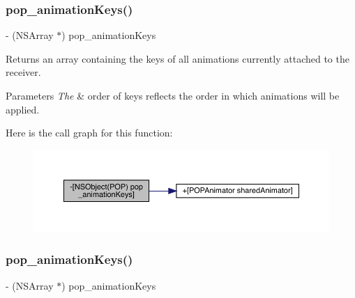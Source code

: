 \subsubsection{\texorpdfstring{pop\+\_\+animation\+Keys()}{pop\_animationKeys()}\hspace{0.1cm}{\footnotesize\ttfamily [2/3]}}
{\footnotesize\ttfamily -\/ (N\+S\+Array $\ast$) pop\+\_\+animation\+Keys \begin{DoxyParamCaption}{ }\end{DoxyParamCaption}}

Returns an array containing the keys of all animations currently attached to the receiver. 
\begin{DoxyParams}{Parameters}
{\em The} & order of keys reflects the order in which animations will be applied. \\
\hline
\end{DoxyParams}
Here is the call graph for this function\+:\nopagebreak
\begin{figure}[H]
\begin{center}
\leavevmode
\includegraphics[width=350pt]{category_n_s_object_07_p_o_p_08_a1651078990a6428516ef74bc0eed7480_cgraph}
\end{center}
\end{figure}
\mbox{\label{category_n_s_object_07_p_o_p_08_a1651078990a6428516ef74bc0eed7480}} 
\subsubsection{\texorpdfstring{pop\+\_\+animation\+Keys()}{pop\_animationKeys()}\hspace{0.1cm}{\footnotesize\ttfamily [3/3]}}
{\footnotesize\ttfamily -\/ (N\+S\+Array $\ast$) pop\+\_\+animation\+Keys \begin{DoxyParamCaption}{ }\end{DoxyParamCaption}}

